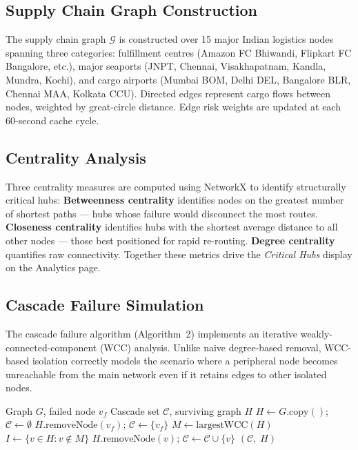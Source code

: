 \documentclass[conference]{IEEEtran}
\begin{document}
\subsection{Supply Chain Graph Construction}

The supply chain graph $\mathcal{G}$ is constructed over 15 major
Indian logistics nodes spanning three categories:
fulfillment centres (Amazon FC Bhiwandi, Flipkart FC Bangalore, etc.),
major seaports (JNPT, Chennai, Visakhapatnam, Kandla, Mundra, Kochi),
and cargo airports (Mumbai BOM, Delhi DEL, Bangalore BLR, Chennai MAA,
Kolkata CCU). Directed edges represent cargo flows between nodes,
weighted by great-circle distance. Edge risk weights are updated at
each 60-second cache cycle.

\subsection{Centrality Analysis}

Three centrality measures are computed using NetworkX to identify
structurally critical hubs:
\textbf{Betweenness centrality} identifies nodes on the greatest
number of shortest paths — hubs whose failure would disconnect
the most routes.
\textbf{Closeness centrality} identifies hubs with the shortest
average distance to all other nodes — those best positioned for
rapid re-routing.
\textbf{Degree centrality} quantifies raw connectivity.
Together these metrics drive the \textit{Critical Hubs} display
on the Analytics page.

\subsection{Cascade Failure Simulation}

The cascade failure algorithm (Algorithm~2) implements an
iterative weakly-connected-component (WCC) analysis. Unlike
naive degree-based removal, WCC-based isolation correctly models
the scenario where a peripheral node becomes unreachable from
the main network even if it retains edges to other isolated nodes.

\begin{algorithm}
\caption{WCC-Based Cascade Failure}
\begin{algorithmic}[1]
\REQUIRE Graph $G$, failed node $v_f$
\ENSURE Cascade set $\mathcal{C}$, surviving graph $H$
\STATE $H \leftarrow G.\text{copy}()$;
  $\mathcal{C} \leftarrow \emptyset$
\STATE $H.\text{removeNode}(v_f)$;
  $\mathcal{C} \leftarrow \{v_f\}$
\REPEAT
  \STATE $M \leftarrow \text{largestWCC}(H)$
  \STATE $I \leftarrow \{v \in H : v \notin M\}$
    \STATE $H.\text{removeNode}(v)$;
      $\mathcal{C} \leftarrow \mathcal{C} \cup \{v\}$
  \ENDFOR
{}
\RETURN $(\mathcal{C},\; H)$
\end{algorithmic}
\end{algorithm}
\end{document}
